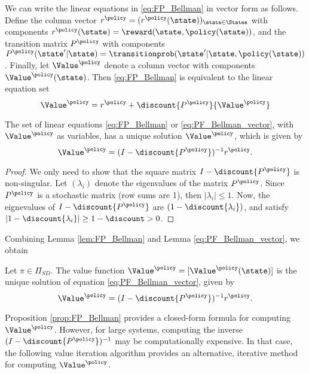 We can write the linear equations in \eqref{eq:FP_Bellman} in vector
form as follows. Define the column vector ${r^\policy } =
{({r^\policy }(\state))_{\state \in \States}}$ with components
${r^\policy }(\state) = \reward(\state,\policy (\state))$, and the
transition matrix ${P^\policy }$ with components ${P^\policy
}(\state'|\state) = \transitionprob(\state'|\state,\policy (\state))$. Finally,
let ${\Value^\policy }$ denote a column vector with components
${\Value^\policy }(\state)$. Then \eqref{eq:FP_Bellman} is
equivalent to the linear equation set
\begin{equation}\label{eq:PF_Bellman_vector}
{\Value^\policy } = {r^\policy } + \discount {P^\policy
}{\Value^\policy }
\end{equation}

\begin{lemma}\label{lem:FP_Bellman_sol}
The set of linear equations \eqref{eq:FP_Bellman} or
\eqref{eq:PF_Bellman_vector}, with ${\Value^\policy }$ as variables,
has a unique solution ${\Value^\policy }$, which is given by
\[{\Value^\policy } = {(I - \discount {P^\policy })^{ -
1}}{r^\policy }.\]
\end{lemma}
\begin{proof}
We only need to show that the square matrix $I - \discount
{P^\policy }$ is non-singular.  Let $({\lambda _i})$ denote the
eigenvalues of the matrix ${P^\policy }$. Since ${P^\policy }$ is a
stochastic matrix (row sums are 1), then $|{\lambda _i}| \le 1$.
Now, the eignevalues of $I - \discount {P^\policy }$ are $(1 -
\discount {\lambda _i})$, and satisfy $|1 - \discount {\lambda _i}|
\ge 1 - \discount  > 0$.
\end{proof}

Combining Lemma \ref{lem:FP_Bellman} and Lemma \ref{eq:PF_Bellman_vector}, we obtain

\begin{proposition}\label{prop:FP_Bellman}
Let $\pi\in \Pi_{SD}$. The value function ${\Value^\policy } =
[{\Value^\policy }(\state)]$ is the unique solution of equation
\eqref{eq:PF_Bellman_vector}, given by \[{\Value^\policy } = {(I -
\discount {P^\policy })^{ - 1}}{r^\policy }.\]
\end{proposition}

Proposition \ref{prop:FP_Bellman} provides a closed-form formula for
computing $\Value_{}^\policy$. However, for large systems, computing
the inverse ${(I - \discount {P^\policy })^{ - 1}}$ may be
computationally expensive. In that case, the following value
iteration algorithm provides an alternative, iterative method for
computing $\Value_{}^\policy$.

